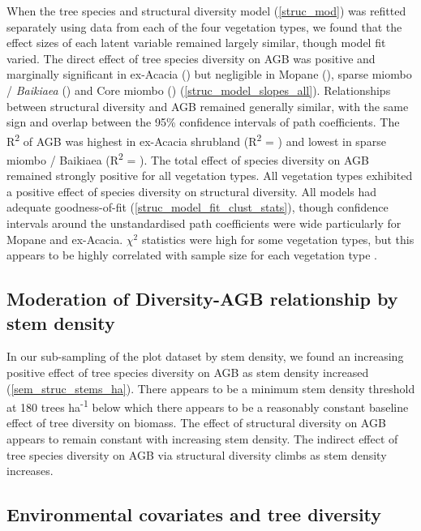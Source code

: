 \documentclass[11pt,a4paper]{article}
\newcommand{\textapprox}{\raisebox{0.5ex}{\texttildelow}}  %
\begin{document}
When the tree species and structural diversity model (\autoref{struc_mod}) was refitted separately using data from each of the four vegetation types, we found that the effect sizes of each latent variable remained largely similar, though model fit varied. The direct effect of tree species diversity on AGB was positive and marginally significant in ex-Acacia (\strucbetacsb{}) but negligible in Mopane (\strucbetadsb{}), sparse miombo / \textit{Baikiaea} (\strucbetaasb{}) and Core miombo (\strucbetabsb{}) (\autoref{struc_model_slopes_all}). Relationships between structural diversity and AGB remained generally similar, with the same sign and overlap between the 95\% confidence intervals of path coefficients. The R\textsuperscript{2} of AGB was highest in ex-Acacia shrubland (R\textsuperscript{2} = \struccrsq{}) and lowest in sparse miombo / Baikiaea (R\textsuperscript{2} = \strucarsq{}). The total effect of species diversity on AGB remained strongly positive for all vegetation types. All vegetation types exhibited a positive effect of species diversity on structural diversity. All models had adequate goodness-of-fit (\autoref{struc_model_fit_clust_stats}), though confidence intervals around the unstandardised path coefficients were wide particularly for Mopane and ex-Acacia. $\chi^{2}$ statistics were high for some vegetation types, but this appears to be highly correlated with sample size for each vegetation type \citep{Hooper2008}.


\subsection{Moderation of Diversity-AGB relationship by stem density}

In our sub-sampling of the plot dataset by stem density, we found an increasing positive effect of tree species diversity on AGB as stem density increased (\autoref{sem_struc_stems_ha}). There appears to be a minimum stem density threshold at \textapprox{}180 trees ha\textsuperscript{-1} below which there appears to be a reasonably constant baseline effect of tree diversity on biomass. The effect of structural diversity on AGB appears to remain constant with increasing stem density. The indirect effect of tree species diversity on AGB via structural diversity climbs as stem density increases. 


\subsection{Environmental covariates and tree diversity}
\end{document}
